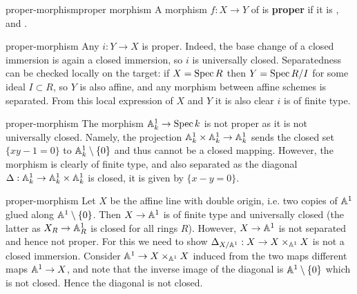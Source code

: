 \begin{topic}{proper-morphism}{proper morphism}
    A morphism $f : X \to Y$ of  is \textbf{proper} if it is ,  and .
\end{topic}

\begin{example}{proper-morphism}
    Any  $i : Y \to X$ is proper. Indeed, the base change of a closed immersion is again a closed immersion, so $i$ is universally closed. Separatedness can be checked locally on the target: if $X = \Spec R$ then $Y = \Spec R / I$ for some ideal $I \subset R$, so $Y$ is also affine, and any morphism between affine schemes is separated. From this local expression of $X$ and $Y$ it is also clear $i$ is of finite type.
\end{example}

\begin{example}{proper-morphism}
    The morphism $\AA_k^1 \to \Spec k$ is not proper as it is not universally closed. Namely, the projection $\AA^1_k \times \AA^1_k \to \AA^1_k$ sends the closed set $\{ xy - 1 = 0 \}$ to $\AA^1_k \setminus \{ 0 \}$ and thus cannot be a closed mapping. However, the morphism is clearly of finite type, and also separated as the diagonal $\Delta : \AA^1_k \to \AA^1_k \times \AA^1_k$ is closed, it is given by $\{ x - y = 0 \}$.
\end{example}

\begin{example}{proper-morphism}
    Let $X$ be the affine line with double origin, i.e. two copies of $\AA^1$ glued along $\AA^1 \setminus \{ 0 \}$. Then $X \to \AA^1$ is of finite type and universally closed (the latter as $X_R \to \AA^1_R$ is closed for all rings $R$). However, $X \to \AA^1$ is not separated and hence not proper. For this we need to show $\Delta_{X / \AA^1} : X \to X \times_{\AA^1} X$ is not a closed immersion. Consider $\AA^1 \to X \times_{\AA^1} X$ induced from the two maps different maps $\AA^1 \to X$, and note that the inverse image of the diagonal is $\AA^1 \setminus \{ 0 \}$ which is not closed. Hence the diagonal is not closed.
\end{example}

